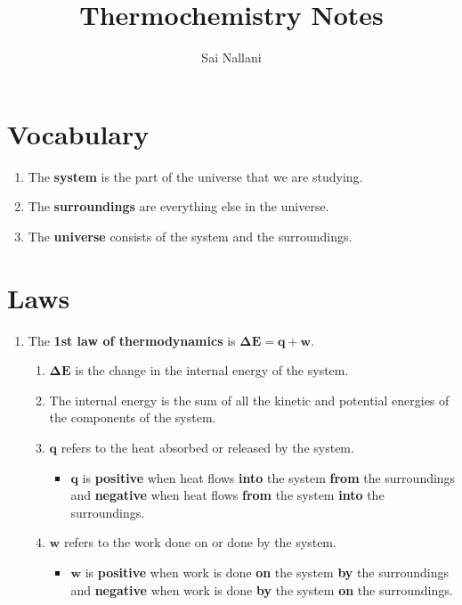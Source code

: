 \documentclass{article}
\title{Thermochemistry Notes}
\author{Sai Nallani}
\begin{document}
\maketitle

\section{Vocabulary}
\begin{enumerate}
    \item The \textbf{system} is the part of the universe that we are studying.
    \item The \textbf{surroundings} are everything else in the universe.
    \item The \textbf{universe} consists of the system and the surroundings.
\end{enumerate}
\section{Laws}
\begin{enumerate}
    \item The \textbf{1st law of thermodynamics} is $\mathbf{\Delta{E} = q + w}$.
    \begin{enumerate}
        \item $\mathbf{\Delta{E}}$ is the change in the internal energy of the system.
        \item The internal energy is the sum of all the kinetic and potential
        energies of the components of the system.
        \item $\mathbf{q}$ refers to the heat absorbed or released by the system.
        \begin{itemize}
            \item $\mathbf{q}$ is \textbf{positive} when heat flows \textbf{into} the system 
            \textbf{from} the surroundings and \textbf{negative} when heat flows \textbf{from} the system
            \textbf{into} the surroundings.
        \end{itemize}
        \item $\mathbf{w}$ refers to the work done on or done by the system.
            \begin{itemize}
                \item $\mathbf{w}$ is \textbf{positive} when  work is done \textbf{on} the system 
                \textbf{by} the surroundings and \textbf{negative} when work is done \textbf{by} the system
                \textbf{on} the surroundings.
            \end{itemize}
    \end{enumerate} 
\end{enumerate}
\end{document}
